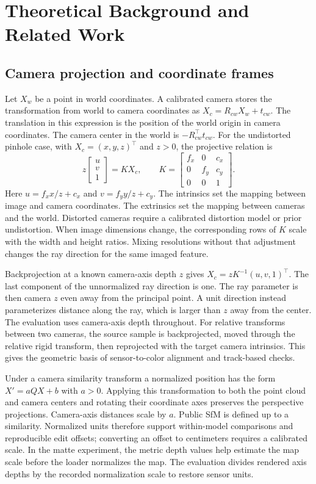 \section{Theoretical Background and Related Work}
\subsection{Camera projection and coordinate frames}
Let $X_w$ be a point in world coordinates. A calibrated camera stores the transformation from world to camera coordinates as $X_c=R_{cw}X_w+t_{cw}$. The translation in this expression is the position of the world origin in camera coordinates. The camera center in the world is $-R_{cw}^{\top}t_{cw}$. For the undistorted pinhole case, with $X_c=(x,y,z)^\top$ and $z>0$, the projective relation is
\begin{equation}
  z\begin{bmatrix}u\\v\\1\end{bmatrix}
  = KX_c,\qquad
  K=\begin{bmatrix}f_x&0&c_x\\0&f_y&c_y\\0&0&1\end{bmatrix}.
  \label{eq:project}
\end{equation}
Here $u=f_x x/z+c_x$ and $v=f_y y/z+c_y$. The intrinsics set the mapping between image and camera coordinates. The extrinsics set the mapping between cameras and the world. Distorted cameras require a calibrated distortion model or prior undistortion. When image dimensions change, the corresponding rows of $K$ scale with the width and height ratios. Mixing resolutions without that adjustment changes the ray direction for the same imaged feature.

Backprojection at a known camera-axis depth $z$ gives $X_c=zK^{-1}(u,v,1)^\top$. The last component of the unnormalized ray direction is one. The ray parameter is then camera $z$ even away from the principal point. A unit direction instead parameterizes distance along the ray, which is larger than $z$ away from the center. The evaluation uses camera-axis depth throughout. For relative transforms between two cameras, the source sample is backprojected, moved through the relative rigid transform, then reprojected with the target camera intrinsics. This gives the geometric basis of sensor-to-color alignment and track-based checks.

Under a camera similarity transform a normalized position has the form $X'=aQX+b$ with $a>0$. Applying this transformation to both the point cloud and camera centers and rotating their coordinate axes preserves the perspective projections. Camera-axis distances scale by $a$. Public SfM is defined up to a similarity. Normalized units therefore support within-model comparisons and reproducible edit offsets; converting an offset to centimeters requires a calibrated scale. In the matte experiment, the metric depth values help estimate the map scale before the loader normalizes the map. The evaluation divides rendered axis depths by the recorded normalization scale to restore sensor units.

